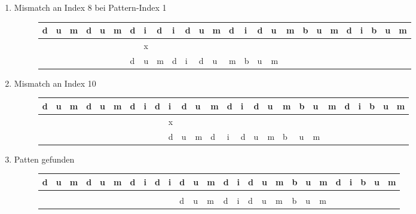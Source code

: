 \documentclass[12pt]{article}
\begin{document}
\begin{itemize}
\begin{enumerate}
\begin{figure}[h]
\end{figure}

\item Mismatch an Index 8 bei Pattern-Index 1 

\begin{figure}[!h]
\begin{tabular}{llllllllllllllllllllllllll}
\hline
d & u & m & d & u & m & d & i & d & i & d & u & m & d & i & d & u & m & b & u & m & d & i & b & u & m \\ \hline
  &   &   &   &   &   &   & x  &   &   &   &   &   &   &   &   &   &   &   &   &   &   &   &   &   &   \\
  &   &   &   &   &   & d & u & m & d & i & d & u & m & b & u & m &   &   &   &   &   &   &   &   &   \\ \hline
\end{tabular}

\end{figure}

\item Mismatch an Index 10
\begin{figure}[!h]
\begin{tabular}{llllllllllllllllllllllllll}
\hline
d & u & m & d & u & m & d & i & d & i & d & u & m & d & i & d & u & m & b & u & m & d & i & b & u & m \\ \hline
  &   &   &   &   &   &   &   &   & x &   &   &   &   &   &   &   &   &   &   &   &   &   &   &   &   \\
  &   &   &   &   &   &   &   &   & d & u & m & d & i & d & u & m & b & u & m &   &   &   &   &   &   \\ \hline
\end{tabular}

\end{figure}

\item Patten gefunden
\begin{figure}[!h]
\begin{tabular}{llllllllllllllllllllllllll}
\hline
d & u & m & d & u & m & d & i & d & i & d & u & m & d & i & d & u & m & b & u & m & d & i & b & u & m \\ \hline
  &   &   &   &   &   &   &   &   &   &   &   &   &   &   &   &   &   &   &   &   &   &   &   &   &   \\
  &   &   &   &   &   &   &   &   &   & d & u & m & d & i & d & u & m & b & u & m &   &   &   &   &   \\ \hline
\end{tabular}
\end{figure}

\end{enumerate}


\end{itemize}
\end{document}
